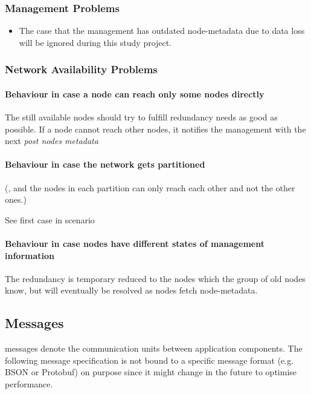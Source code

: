 \subsubsection{Management Problems}\label{sec:scenario-management-problems}
\begin{itemize}
    \item The case that the \gls{management} has outdated \gls{node-metadata} due to data loss will be ignored during this study project.
\end{itemize}

\subsubsection{Network Availability Problems}\label{sec:scenario-network-errors}
\paragraph{Behaviour in case a node can reach only some nodes directly}
The still available \glspl{node} should try to fulfill redundancy needs as good as possible.
If a \gls{node} cannot reach other \glspl{node}, it notifies the \gls{management} with the next \emph{post nodes metadata}

\paragraph{Behaviour in case the network gets partitioned}
(, and the \glspl{node} in each partition can only reach each other and not the other ones.)

See first case in scenario~

\paragraph{Behaviour in case nodes have different states of management information}
The redundancy is temporary reduced to the \glspl{node} which the group of old \glspl{node} know, but will eventually be resolved as \glspl{node} fetch \gls{node-metadata}.


\subsection{Messages}\label{sec:messages}

\Glspl{message} denote the communication units between application components. The following message specification is not bound to a specific message format (e.g. BSON or Protobuf) on purpose since it might change in the future to optimise performance.

